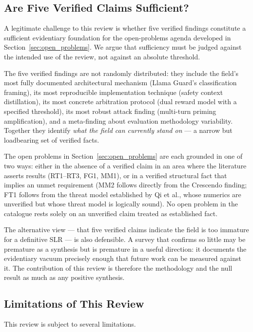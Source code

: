 \subsection{Are Five Verified Claims Sufficient?}

A legitimate challenge to this review is whether five verified findings constitute
a sufficient evidentiary foundation for the open-problems agenda developed in
Section~\ref{sec:open_problems}.
We argue that sufficiency must be judged against the intended use of the review,
not against an absolute threshold.

The five verified findings are not randomly distributed: they include the
field's most fully documented architectural mechanism (Llama Guard's classification
framing), its most reproducible implementation technique (safety context
distillation), its most concrete arbitration protocol (dual reward model with a
specified threshold), its most robust attack finding (multi-turn priming
amplification), and a meta-finding about evaluation methodology variability.
Together they identify \emph{what the field can currently stand on} — a narrow but
loadbearing set of verified facts.

The open problems in Section~\ref{sec:open_problems} are each grounded in one of
two ways: either in the absence of a verified claim in an area where the literature
asserts results (RT1--RT3, FG1, MM1), or in a verified structural fact that implies
an unmet requirement (MM2 follows directly from the Crescendo finding; FT1 follows
from the threat model established by Qi et al., whose numerics are unverified but
whose threat model is logically sound).
No open problem in the catalogue rests solely on an unverified claim treated as
established fact.

The alternative view — that five verified claims indicate the field is too
immature for a definitive SLR — is also defensible.
A survey that confirms so little may be premature as a synthesis but is premature
in a useful direction: it documents the evidentiary vacuum precisely enough that
future work can be measured against it.
The contribution of this review is therefore the methodology and the null result
as much as any positive synthesis.

\subsection{Limitations of This Review}

This review is subject to several limitations.

